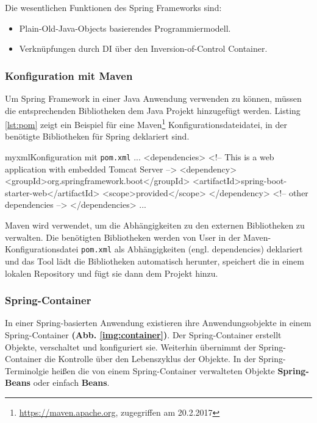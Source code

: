 Die wesentlichen Funktionen des Spring Frameworks sind:
\begin{itemize}
	\item Plain-Old-Java-Objects basierendes Programmiermodell.
	\item Verknüpfungen durch DI über den Inversion-of-Control Container.
\end{itemize}

\subsubsection{Konfiguration mit Maven}
Um Spring Framework in einer Java Anwendung verwenden zu können, müssen die entsprechenden Bibliotheken dem Java Projekt hinzugefügt werden. Listing \ref{lst:pom} zeigt ein Beispiel für eine Maven\footnote{\url{https://maven.apache.org}, zugegriffen am 20.2.2017} Konfigurationsdateidatei, in der benötigte Bibliotheken für Spring deklariert sind.

\begin{listingsboxJava}[label={lst:pom}]{myxml}{Konfiguration mit \texttt{pom.xml}}
...
<dependencies>
        <!-- This is a web application with embedded Tomcat Server -->
        <dependency>
            <groupId>org.springframework.boot</groupId>
            <artifactId>spring-boot-starter-web</artifactId>
            <scope>provided</scope>
        </dependency>
        <!-- other dependencies -->
</dependencies>
...
\end{listingsboxJava}
Maven wird verwendet, um die Abhängigkeiten zu den externen Bibliotheken zu verwalten. Die benötigten Bibliotheken werden von User in der Maven- Konfigurationsdatei \texttt{pom.xml} als Abhängigkeiten (engl. dependencies) deklariert und das Tool lädt die Bibliotheken automatisch herunter, speichert die in einem lokalen Repository und fügt sie dann dem Projekt hinzu.

\subsubsection{Spring-Container}
In einer Spring-basierten Anwendung existieren ihre Anwendungsobjekte in einem Spring-Container \textbf{(Abb. \ref{img:container})}. Der Spring-Container erstellt Objekte, verschaltet und konfiguriert sie. Weiterhin übernimmt der Spring-Container die Kontrolle über den Lebenszyklus der Objekte. In der Spring-Terminolgie heißen die von einem Spring-Container verwalteten Objekte \textbf{Spring-Beans} oder einfach \textbf{Beans}.

